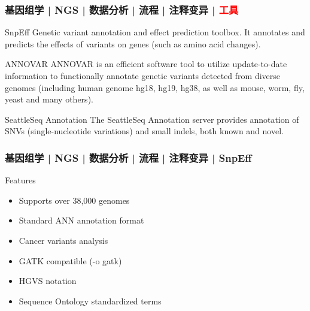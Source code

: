 \begin{frame}
  \frametitle{基因组学 | NGS | 数据分析 | 流程 | 注释变异 | \textcolor{red}{工具}}
  \begin{block}{SnpEff}
    Genetic variant annotation and effect prediction toolbox. It annotates and predicts the effects of variants on genes (such as amino acid changes).
  \end{block}
  \pause
  \begin{block}{ANNOVAR}
    ANNOVAR is an efficient software tool to utilize update-to-date information to functionally annotate genetic variants detected from diverse genomes (including human genome hg18, hg19, hg38, as well as mouse, worm, fly, yeast and many others).
  \end{block}
  \pause
  \begin{block}{SeattleSeq Annotation}
    The SeattleSeq Annotation server provides annotation of SNVs (single-nucleotide variations) and small indels, both known and novel.
  \end{block}
\end{frame}

\begin{frame}
  \frametitle{基因组学 | NGS | 数据分析 | 流程 | 注释变异 | SnpEff}
  \begin{block}{Features}
    \begin{itemize}
      \item Supports over 38,000 genomes
      \item Standard ANN annotation format
      \item Cancer variants analysis
      \item GATK compatible (-o gatk)
      \item HGVS notation
      \item Sequence Ontology standardized terms
    \end{itemize}
  \end{block}
\end{frame}

